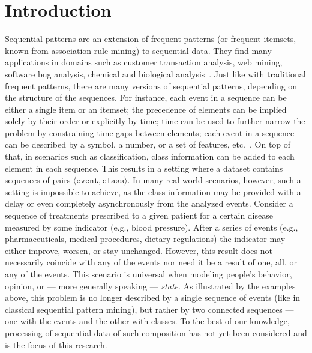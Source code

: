 \documentclass[runningheads,a4paper]{llncs}
\begin{document}
\section{Introduction}
\label{sec:introduction}

Sequential patterns are an extension of frequent patterns (or frequent itemsets, known from association rule mining) to sequential data.
They find many applications in domains such as customer transaction analysis, web mining, software bug analysis, chemical and biological analysis~\cite{Aggarwal:2014}.
Just like with traditional frequent patterns, there are many versions of sequential patterns, depending on the structure of the sequences.
For instance, each event in a sequence can be either a single item or an itemset; the precedence of elements can be implied solely by their order or explicitly by time; time can be used to further narrow the problem by constraining time gaps between elements; each event in a sequence can be described by a symbol, a number, or a set of features, etc.~\cite{Dong:2009}.
On top of that, in scenarios such as classification, class information can be added to each element in each sequence.
This results in a setting where a dataset contains sequences of pairs $\langle\texttt{event}, \texttt{class}\rangle$.
In many real-world scenarios, however, such a setting is impossible to achieve, as the class information may be provided with a delay or even completely asynchronously from the analyzed events.
Consider a sequence of treatments prescribed to a given patient for a certain disease measured by some indicator (e.g., blood pressure).
After a series of events (e.g., pharmaceuticals, medical procedures, dietary regulations) the indicator may either improve, worsen, or stay unchanged.
However, this result does not necessarily coincide with any of the events nor need it be a result of one, all, or any of the events.
This scenario is universal when modeling people's behavior, opinion, or --- more generally speaking --- \textit{state}.
As illustrated by the examples above, this problem is no longer described by a single sequence of events (like in classical sequential pattern mining), but rather by two connected sequences --- one with the events and the other with classes.
To the best of our knowledge, processing of sequential data of such composition has not yet been considered and is the focus of this research.
\end{document}
